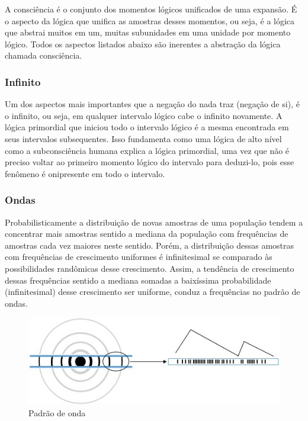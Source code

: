 A consciência é o conjunto dos momentos lógicos unificados de uma expansão. É o aspecto da lógica que unifica as amostras desses momentos, ou seja, é a lógica que abstrai muitos em um, muitas subunidades em uma unidade por momento lógico. Todos os aspectos listados abaixo são inerentes a abstração da lógica chamada consciência.

\subsubsection{Infinito}
Um dos aspectos mais importantes que a negação do nada traz (negação de si), é o infinito, ou seja, em qualquer intervalo lógico cabe o infinito novamente. A lógica primordial que iniciou todo o intervalo lógico é a mesma encontrada em seus intervalos subsequentes. Isso fundamenta como uma lógica de alto nível como a subconsciência humana explica a lógica primordial, uma vez que não é preciso voltar ao primeiro momento lógico do intervalo para deduzi-lo, pois esse fenômeno é onipresente em todo o intervalo.

\subsubsection{Ondas}
Probabilisticamente a distribuição de novas amostras de uma população tendem a concentrar mais amostras sentido a mediana da população com frequências de amostras cada vez maiores neste sentido. Porém, a distribuição dessas amostras com frequências de crescimento uniformes é infinitesimal se comparado às possibilidades randômicas desse crescimento. Assim, a tendência de crescimento dessas frequências sentido a mediana somadas a baixíssima probabilidade (infinitesimal) desse crescimento ser uniforme, conduz a frequências no padrão de ondas.
\begin{figure}[H]
\caption{Padrão de onda}
\label{fig:consciousness_waves}
\centering
\includegraphics[scale=1]{sections/images/consciousness_waves.jpg}
\end{figure}

